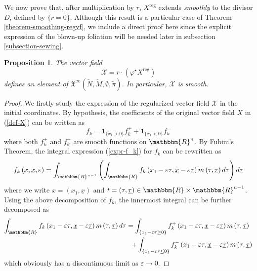\documentclass[11pt,psamsfonts]{article}
\newcommand{\tmmathbf}[1]{\ensuremath{\boldsymbol{#1}}}
\newtheorem{Proposition}[Theorem]{Proposition}
\theoremstyle{definition}
\theoremstyle{remark}
\newcommand{\cR}{\ensuremath{\mathbbm{R}}}
\newcommand{\eps}{\varepsilon }
\newcommand{\vf}{f}
\newcommand{\reg}{\mathrm{reg}}
\begin{document}
We now prove that, after multiplication by $r$, $X^\reg$ extends \emph{smoothly} to the divisor $D$, defined by $\{r=0\}$. Although this result is a particular case of Theorem \ref{theorem-smoothing-regvf}, we include a direct proof here since the explicit expression of the blown-up foliation will be needed later in subsection \ref{subsection-sewing}.
\begin{Proposition}\label{prop-smoothing-one-comp}
The vector field 
$$\mathcal{X} = r\cdot (\varphi^\star X^\reg)$$ 
defines an element of $\mathfrak{X }^{\infty}(\tilde N,\tilde M,\emptyset,\tilde \pi)$.  In particular, $\mathcal{X}$ is smooth.
\end{Proposition}
\begin{proof}
We firstly study the expression of the regularized vector field $\mathcal{X}$ in the initial coordinates. 
By hypothesis, the coefficients of the original vector field $X$ in (\ref{def-X}) can be written as
\begin{equation}\label{coeff-fkX}
\vf_k = \tmmathbf{1}_{\{ x_1 > 0 \}} \vf_{k }^+ + \tmmathbf{1}_{\{ x_1 < 0 \}} \vf_{k }^- 
\end{equation}
where both $\vf_k^+$ and $\vf_k^-$ are smooth functions on $\cR^n$. 
By Fubini's Theorem, the integral expression (\ref{expr-f_k}) for $f_k$ can be rewritten as
\begin{equation}\label{Fubini-f_k}
  f_k \left( x, \underline{x}, \eps  \right) = \int_{\cR^{n - 1}}
  \left( \int_{\cR}  \vf_k \left( x_1- \eps \tau, \underline{x} -
  \eps  \underline{\tau} \right) m \left( \tau, \underline{\tau} \right)
  d \tau \right) d \underline{\tau}
\end{equation}
where we write $x = (x_1,\underline{x})$ and $t = (\tau,\underline{\tau}) \in \cR \times \cR^{n-1}$. Using the above decomposition of $\vf_k$, the innermost integral can be further decomposed as 
{\small \begin{align}\label{equation-integexpr}
\int_{\cR} 
   \vf_k \left( x_1- \eps \tau, \underline{x} -
  \eps  \underline{\tau} \right) m \left( \tau, \underline{\tau} \right) d\tau
   &= \int_{\{ x_1- \eps \tau \ge 0 \}} 
        \vf_k^+ \left( x_1- \eps \tau, \underline{x} -
  \eps  \underline{\tau} \right) m \left( \tau, \underline{\tau} \right)  \\
   &\;\;+ \int_{\{ x_1- \eps \tau \le 0 \}} 
        \vf_k^- \left( x_1- \eps \tau, \underline{x} -
  \eps  \underline{\tau} \right) m \left( \tau, \underline{\tau} \right) \notag
\end{align}}
which obviously has a discontinuous limit as $\eps \rightarrow 0$. 


\end{proof}
\end{document}
